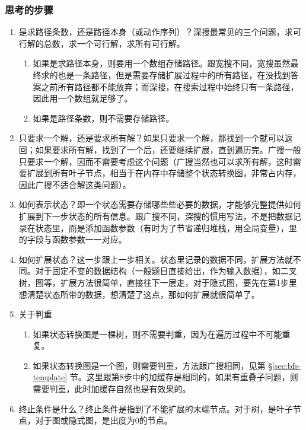 \subsubsection{思考的步骤}
\begin{enumerate}
\item 是求路径条数，还是路径本身（或动作序列）？深搜最常见的三个问题，求可行解的总数，求一个可行解，求所有可行解。
    \begin{enumerate}
    \item 如果是求路径本身，则要用一个数组存储路径。跟宽搜不同，宽搜虽然最终求的也是一条路径，但是需要存储扩展过程中的所有路径，在没找到答案之前所有路径都不能放弃；而深搜，在搜索过程中始终只有一条路径，因此用一个数组就足够了。
    \item 如果是路径条数，则不需要存储路径。
    \end{enumerate}

\item 只要求一个解，还是要求所有解？如果只要求一个解，那找到一个就可以返回；如果要求所有解，找到了一个后，还要继续扩展，直到遍历完。广搜一般只要求一个解，因而不需要考虑这个问题（广搜当然也可以求所有解，这时需要扩展到所有叶子节点，相当于在内存中存储整个状态转换图，非常占内存，因此广搜不适合解这类问题）。

\item 如何表示状态？即一个状态需要存储哪些些必要的数据，才能够完整提供如何扩展到下一步状态的所有信息。跟广搜不同，深搜的惯用写法，不是把数据记录在状态里，而是添加函数参数（有时为了节省递归堆栈，用全局变量），里的字段与函数参数一一对应。

\item 如何扩展状态？这一步跟上一步相关。状态里记录的数据不同，扩展方法就不同。对于固定不变的数据结构（一般题目直接给出，作为输入数据），如二叉树，图等，扩展方法很简单，直接往下一层走，对于隐式图，要先在第1步里想清楚状态所带的数据，想清楚了这点，那如何扩展就很简单了。

\item 关于判重
    \begin{enumerate}
    \item 如果状态转换图是一棵树，则不需要判重，因为在遍历过程中不可能重复。
    \item 如果状态转换图是一个图，则需要判重，方法跟广搜相同，见第 \S \ref{sec:bfs-template} 节。这里跟第8步中的加缓存是相同的，如果有重叠子问题，则需要判重，此时加缓存自然也是有效果的。
    \end{enumerate}

\item 终止条件是什么？终止条件是指到了不能扩展的末端节点。对于树，是叶子节点，对于图或隐式图，是出度为0的节点。


\end{enumerate}
